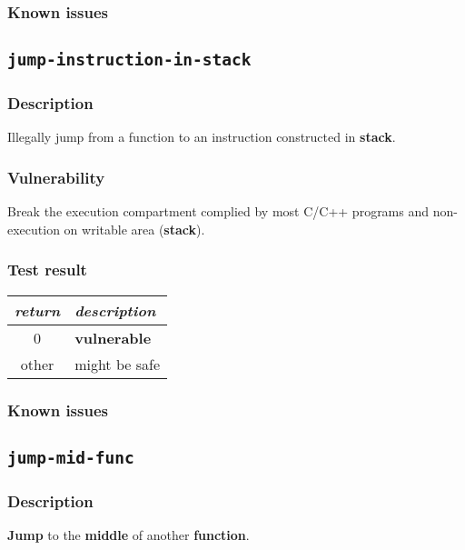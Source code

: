 \documentclass[a4paper]{book}
\begin{document}
\subsubsection{Known issues}

\newpage
\subsection{\texttt{jump-instruction-in-stack}}\label{test-jump-instruction-in-stack}

\subsubsection{Description}
Illegally jump from a function to an instruction constructed in \textbf{stack}.

\subsubsection{Vulnerability}
Break the execution compartment complied by most C/C++ programs and non-execution on writable area (\textbf{stack}).

\subsubsection{Test result}
\begin{tabular}{cl}
  \toprule
  \emph{return}  & \emph{description} \\
  \midrule
  0              & \textbf{vulnerable} \\
  other          & might be safe \\
  \bottomrule
\end{tabular}
  
\subsubsection{Known issues}

\newpage
\subsection{\texttt{jump-mid-func}}\label{test-jump-mid-func}

\subsubsection{Description}
\textbf{Jump} to the \textbf{middle} of another \textbf{function}.
\end{document}
